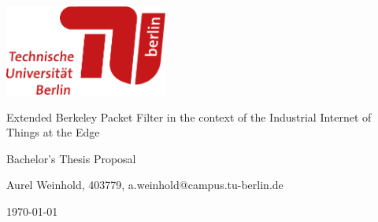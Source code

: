 \documentclass[11pt, a4paper]{scrartcl}
\begin{document}
\begin{title}

    \begin{center}
        \includegraphics[width=0.4\textwidth]{tu_logo.pdf}

        \vspace*{2em}
        \LARGE
        Extended Berkeley Packet Filter in the context of the Industrial
        Internet of Things at the Edge

        \vspace*{1em}
        \small
        Bachelor's Thesis Proposal

        \vspace*{1em}
        Aurel Weinhold, 403779, a.weinhold@campus.tu-berlin.de

        \vspace*{1em}
        \today

    \end{center}

\end{title}







\printbibliography
\end{document}
